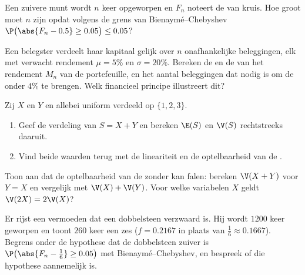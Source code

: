 \begin{exercise}[$\star$]\label{exo:g12:sums:3}
Een zuivere munt wordt $n$ keer opgeworpen en $F_n$ noteert de  van
kruis. Hoe groot moet $n$ zijn opdat volgens de grens van
Bienaymé--Chebyshev $\P\bigl(\abs{F_n - 0.5} \geq 0.05\bigr) \leq 0.05$?
\end{exercise}

\begin{exercise}[$\star\star$]\label{exo:g12:sums:4}
Een belegster verdeelt haar kapitaal gelijk over $n$ onafhankelijke
beleggingen, elk met verwacht rendement $\mu = 5\%$ en 
$\sigma = 20\%$. Bereken de  en de  van
het rendement $M_n$ van de portefeuille, en het aantal beleggingen dat nodig
is om de  onder $4\%$ te brengen. Welk financieel principe
illustreert dit?
\end{exercise}

\begin{exercise}[$\star\star$]\label{exo:g12:sums:5}
Zij $X$ en $Y$  en allebei uniform verdeeld op $\{1, 2, 3\}$.
\begin{enumerate}
  \item Geef de verdeling van $S = X + Y$ en bereken $\E(S)$ en $\V(S)$
        rechtstreeks daaruit.
  \item Vind beide waarden terug met de lineariteit en de optelbaarheid van
        de .
\end{enumerate}
\end{exercise}

\begin{exercise}[$\star\star$]\label{exo:g12:sums:6}
Toon aan dat de optelbaarheid van de  zonder  kan
falen: bereken $\V(X + Y)$ voor $Y = X$ en vergelijk met $\V(X) + \V(Y)$. Voor
welke variabelen $X$ geldt $\V(2X) = 2\V(X)$?
\end{exercise}

\begin{exercise}[$\star\star$]\label{exo:g12:sums:7}
Er rijst een vermoeden dat een dobbelsteen verzwaard is. Hij wordt $1200$ keer
geworpen en toont $260$ keer een zes ($f = 0.2167$ in plaats van
$\frac16 \approx 0.1667$). Begrens onder de hypothese dat de dobbelsteen
zuiver is $\P\bigl(\abs{F_n - \frac16} \geq 0.05\bigr)$ met
Bienaymé--Chebyshev, en bespreek of die hypothese aannemelijk is.
\end{exercise}

